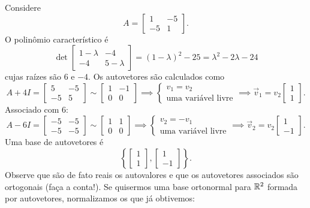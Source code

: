 \documentclass[../livro.tex]{subfiles}
\begin{document}
\begin{example}
	Considere
	\[
	A = \begin{bmatrix}
	1 & -5 \\
	-5 &  1
	\end{bmatrix}.
	\] O polinômio característico é
	\[
	\det \begin{bmatrix}
	1-\lambda & -4 \\
	-4 & 5-\lambda
	\end{bmatrix} = (1-\lambda)^2 - 25 = \lambda^2 - 2 \lambda - 24
	\] cujas raízes são $6$ e  $-4$. Os autovetores são calculados como
	\[
	A + 4 I = 
	\begin{bmatrix}
	5 & -5 \\
	-5 & 5
	\end{bmatrix} \sim 
	\begin{bmatrix}
	1 & -1 \\
	0 & 0
	\end{bmatrix} \implies 
	\left\{
	\begin{array}{l}
	v_1 = v_2 \\ 
	\text{uma variável livre}
	\end{array}
	\right. \implies \vec{v}_1 = v_2
	\begin{bmatrix}
	1  \\
	1
	\end{bmatrix}.
	\] Associado com $6$:
	\[
	A - 6 I = 
	\begin{bmatrix}
	-5 & -5 \\
	-5 & -5
	\end{bmatrix} \sim 
	\begin{bmatrix}
	1 & 1 \\
	0 & 0
	\end{bmatrix} \implies 
	\left\{
	\begin{array}{l}
	v_2 = - v_1 \\ 
	\text{uma variável livre}
	\end{array}
	\right. \implies \vec{v}_2 = v_2
	\begin{bmatrix}
	1 \\
	-1
	\end{bmatrix}.
	\] Uma base de autovetores é
	\[
	\left\lbrace 
	\begin{bmatrix}
	1 \\
	1
	\end{bmatrix}, 
	\begin{bmatrix}
	1 \\
	-1
	\end{bmatrix}
	\right\rbrace.
	\] Observe que são de fato reais os autovalores e que os autovetores associados são ortogonais (faça a conta!). Se quisermos uma base ortonormal para $\mathbb{R}^2$ formada por autovetores, normalizamos os que já obtivemos:

\end{example}
\end{document}
